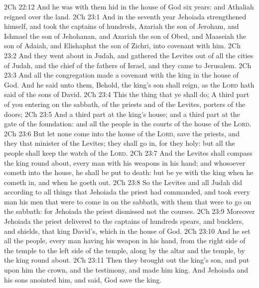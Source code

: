 \vs 2Ch 22:12 And he was with them hid in the house of God six years: and Athaliah reigned over the land.
\vs 2Ch 23:1 And in the seventh year Jehoiada strengthened himself, and took the captains of hundreds, Azariah the son of Jeroham, and Ishmael the son of Jehohanan, and Azariah the son of Obed, and Maaseiah the son of Adaiah, and Elishaphat the son of Zichri, into covenant with him.
\vs 2Ch 23:2 And they went about in Judah, and gathered the Levites out of all the cities of Judah, and the chief of the fathers of Israel, and they came to Jerusalem.
\vs 2Ch 23:3 And all the congregation made a covenant with the king in the house of God. And he said unto them, Behold, the king's son shall reign, as the \textsc{Lord} hath said of the sons of David.
\vs 2Ch 23:4 This  the thing that ye shall do; A third part of you entering on the sabbath, of the priests and of the Levites,  porters of the doors;
\vs 2Ch 23:5 And a third part  at the king's house; and a third part at the gate of the foundation: and all the people  in the courts of the house of the \textsc{Lord}.
\vs 2Ch 23:6 But let none come into the house of the \textsc{Lord}, save the priests, and they that minister of the Levites; they shall go in, for they  holy: but all the people shall keep the watch of the \textsc{Lord}.
\vs 2Ch 23:7 And the Levites shall compass the king round about, every man with his weapons in his hand; and whosoever  cometh into the house, he shall be put to death: but be ye with the king when he cometh in, and when he goeth out.
\vs 2Ch 23:8 So the Levites and all Judah did according to all things that Jehoiada the priest had commanded, and took every man his men that were to come in on the sabbath, with them that were to go  on the sabbath: for Jehoiada the priest dismissed not the courses.
\vs 2Ch 23:9 Moreover Jehoiada the priest delivered to the captains of hundreds spears, and bucklers, and shields, that  king David's, which  in the house of God.
\vs 2Ch 23:10 And he set all the people, every man having his weapon in his hand, from the right side of the temple to the left side of the temple, along by the altar and the temple, by the king round about.
\vs 2Ch 23:11 Then they brought out the king's son, and put upon him the crown, and  the testimony, and made him king. And Jehoiada and his sons anointed him, and said, God save the king.
